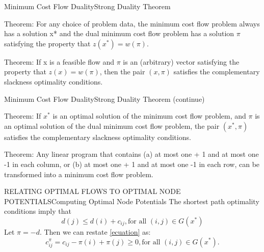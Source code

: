 \documentclass{beamer}
\begin{document}
\begin{frame}{Minimum Cost Flow Duality}{Strong Duality Theorem}
\begin{block}{Theorem: }
  For any choice of problem data, the
  minimum cost flow problem always has a solution x* and the dual minimum cost
  flow problem has a solution $\pi$ satisfying the property that $z(x^*) = w(\pi)$.  
\end{block}
\begin{block}{Theorem: }
  If x is a feasible flow and $\pi$ is an (arbitrary) vector satisfying
  the property that $z(x) = w(\pi)$, then the pair $(x, \pi)$ satisfies the complementary
  slackness optimality conditions.  
\end{block}
\end{frame}

\begin{frame}{Minimum Cost Flow Duality}{Strong Duality Theorem (continue)}
\begin{block}{Theorem: }
  If $x^*$ is an optimal solution of the minimum cost flow problem, and $\pi$ is an optimal solution of the dual minimum cost flow problem, the pair
  $(x^*, \pi)$ satisfies the complementary slackness optimality conditions.
\end{block}
\begin{block}{Theorem: }
  Any linear program that contains (a) at most one + 1 and at most one -1 in each column, or (b) at most one + 1 and at most one -1 in each
  row, can be transformed into a minimum cost flow problem.  
\end{block}
\end{frame}

\begin{frame}{RELATING OPTIMAL FLOWS TO OPTIMAL NODE
  POTENTIALS}{Computing Optimal Node Potentials}
  The shortest path optimality conditions imply that
  \begin{equation}
    d(j) \leq d(i) + c_{ij}, \text{for all } (i,j) \in G(x^*) \label{ecuation}
  \end{equation}
  Let $\pi = -d$. Then we can restate \ref{ecuation} as: \begin{equation}
    c_{ij}^{\pi} = c_{ij} - \pi(i) + \pi(j) \geq 0, \text{for all } (i,j) \in G(x^*).
  \end{equation}  
\end{frame}
\end{document}
